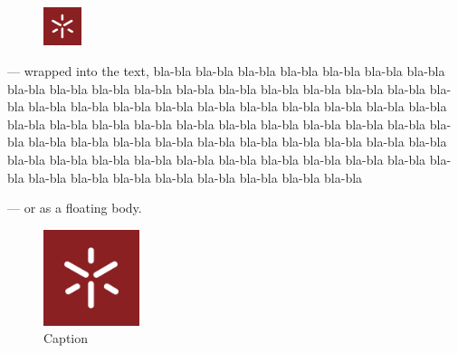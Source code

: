 \begin{figure}	
	\includegraphics[width=0.1\textwidth]{images/UM.jpg}
\end{figure}
\noindent --- wrapped into the text,
bla-bla bla-bla bla-bla bla-bla bla-bla bla-bla bla-bla bla-bla bla-bla bla-bla
bla-bla bla-bla bla-bla bla-bla bla-bla bla-bla bla-bla bla-bla bla-bla bla-bla
bla-bla bla-bla bla-bla bla-bla bla-bla bla-bla bla-bla bla-bla bla-bla bla-bla
bla-bla bla-bla bla-bla bla-bla bla-bla bla-bla bla-bla bla-bla bla-bla bla-bla
bla-bla bla-bla bla-bla bla-bla bla-bla bla-bla bla-bla bla-bla bla-bla bla-bla bla-bla bla-bla bla-bla bla-bla
bla-bla bla-bla bla-bla bla-bla bla-bla bla-bla bla-bla bla-bla bla-bla bla-bla bla-bla bla-bla bla-bla bla-bla

\noindent --- or as a floating body.
\begin{figure}
\begin{center}
	\includegraphics[width=0.25\textwidth]{images/UM.jpg}
\end{center}
\caption{Caption}
\end{figure}